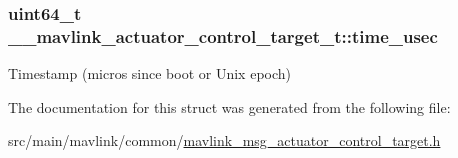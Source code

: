 \hypertarget{struct____mavlink__actuator__control__target__t_a6515683b07d3141ba6b997f2ad6c6b32}{
\subsubsection[{time\+\_\+usec}]{\setlength{\rightskip}{0pt plus 5cm}uint64\+\_\+t \+\_\+\+\_\+mavlink\+\_\+actuator\+\_\+control\+\_\+target\+\_\+t\+::time\+\_\+usec}}\label{struct____mavlink__actuator__control__target__t_a6515683b07d3141ba6b997f2ad6c6b32}


Timestamp (micros since boot or Unix epoch) 



The documentation for this struct was generated from the following file\+:\begin{DoxyCompactItemize}
\item 
src/main/mavlink/common/\hyperlink{mavlink__msg__actuator__control__target_8h}{mavlink\+\_\+msg\+\_\+actuator\+\_\+control\+\_\+target.\+h}\end{DoxyCompactItemize}
